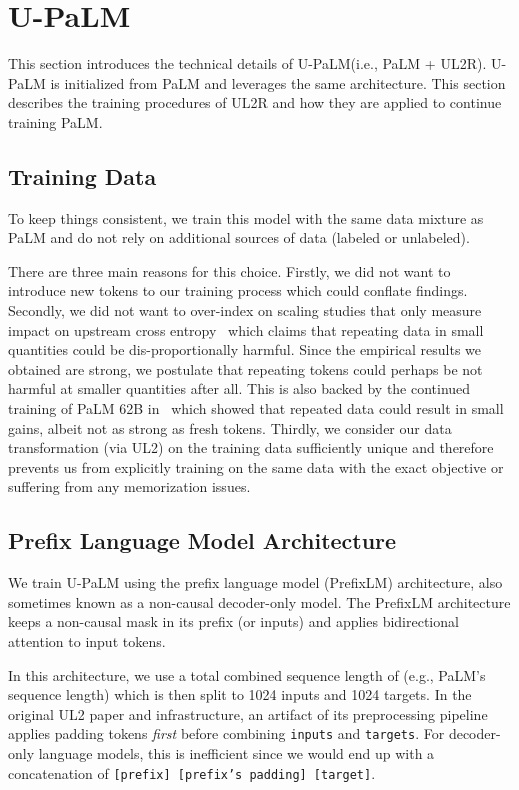 \documentclass{article}
\newcommand{\methodname}{UL2R\xspace}
\newcommand{\modelname}{U-PaLM\xspace}
\begin{document}
\section{\modelname}
This section introduces the technical details of \modelname (i.e., PaLM + \methodname). \modelname is initialized from PaLM and leverages the same architecture. This section describes the training procedures of \methodname and how they are applied to continue training PaLM.
\subsection{Training Data} To keep things consistent, we train this model with the same data mixture as PaLM and do not rely on additional sources of data (labeled or unlabeled). 

There are three main reasons for this choice. Firstly, we did not want to introduce new tokens to our training process which could conflate findings. Secondly, we did not want to over-index on scaling studies that only measure impact on upstream cross entropy~\citep{hernandez2022scaling} which claims that repeating data in small quantities could be dis-proportionally harmful. Since the empirical results we obtained are strong, we postulate that repeating tokens could perhaps be not harmful at smaller quantities after all. This is also backed by the continued training of PaLM 62B in~\citep{chowdhery2022palm} which showed that repeated data could result in small gains, albeit not as strong as fresh tokens. Thirdly, we consider our data transformation (via UL2) on the training data sufficiently unique and therefore prevents us from explicitly training on the same data with the exact objective or suffering from any memorization issues. 
\subsection{Prefix Language Model Architecture}
We train \modelname using the prefix language model (PrefixLM) architecture, also sometimes known as a non-causal decoder-only model. The PrefixLM architecture keeps a non-causal mask in its prefix (or inputs) and applies bidirectional attention to input tokens. 

In this architecture, we use a total combined sequence length of  (e.g., PaLM's sequence length) which is then split to 1024 inputs and 1024 targets. In the original UL2 paper and infrastructure, an artifact of its preprocessing pipeline applies padding tokens \textit{first} before combining \texttt{inputs} and \texttt{targets}. For decoder-only language models, this is inefficient since we would end up with a concatenation of \texttt{[prefix] [prefix's padding] [target]}. 
\end{document}
